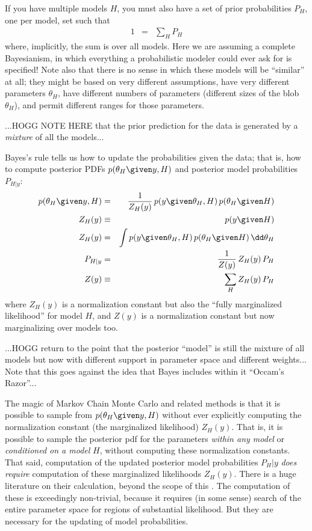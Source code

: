 \documentclass[12pt,twoside]{article}
\begin{document}
If you have multiple models $H$,
  you must also have a set of prior probabilities $P_H$, one per model,
  set such that
\begin{eqnarray}
1 &=& \sum_H P_H
\end{eqnarray}
where, implicitly,
the sum is over all models.
Here we are assuming a complete Bayesianism,
  in which everything a probabilistic modeler could ever ask for is specified!
Note also that there is no sense in which these models will be ``similar'' at all;
  they might be based on very different assumptions,
  have very different parameters $\theta_H$,
  have different numbers of parameters (different sizes of the blob $\theta_H$),
  and permit different ranges for those parameters.

...HOGG NOTE HERE that the prior prediction for the data is generated by a \emph{mixture} of all the models...

Bayes's rule tells us how to update the probabilities given the data;
  that is, how to compute posterior PDFs $p(\theta_H\given y,H)$
  and posterior model probabilities $P_{H|y}$:
\begin{eqnarray}
p(\theta_H\given y,H) &=& \frac{1}{Z_H(y)}\,p(y\given\theta_H,H)\,p(\theta_H\given H)
\\
Z_H(y) &\equiv& p(y\given H)
\\
Z_H(y) &=& \int p(y\given\theta_H,H)\,p(\theta_H\given H)\,\dd\theta_H
\\
P_{H|y} &=& \frac{1}{Z(y)}\,Z_H(y)\,P_H
\\
Z(y) &\equiv& \sum_H Z_H(y)\,P_H
\end{eqnarray}
where
$Z_H(y)$ is a normalization constant
  but also the ``fully marginalized likelihood'' for model $H$, and
$Z(y)$ is a normalization constant but
  now marginalizing over models too.

...HOGG return to the point that the posterior ``model''
  is still the mixture of all models
  but now with different support in parameter space and different weights...
Note that this goes against the idea that Bayes includes within it ``Occam's Razor''...

The magic of Markov Chain Monte Carlo and related methods is that
  it is possible to sample from $p(\theta_H\given y,H)$ without ever explicitly computing
  the normalization constant (the marginalized likelihood) $Z_H(y)$.
That is, it is possible to sample the posterior pdf for the parameters \emph{within any model}
  or \emph{conditioned on a model} $H$,
  without computing these normalization constants.
That said, computation of the updated posterior model probabilities $P_H|y$
  \emph{does require} computation of these marginalized likelihoods $Z_H(y)$.
There is a huge literature on their calculation, beyond the scope of this \documentname.
The computation of these is exceedingly non-trivial,
  because it requires (in some sense) search of the entire parameter space
  for regions of substantial likelihood.
But they are necessary
  for the updating of model probabilities.
\end{document}
